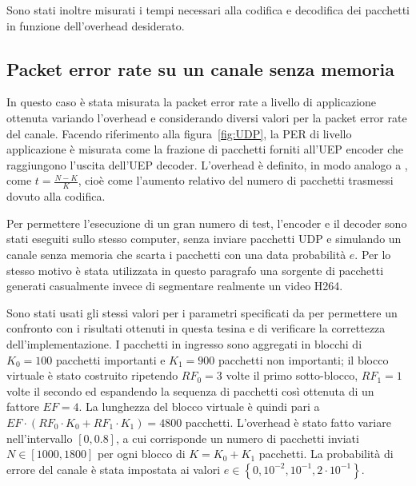 \documentclass[italian, a4paper, 12pt]{article}
\begin{document}
Sono stati inoltre misurati i tempi necessari alla codifica e
decodifica dei pacchetti in funzione dell'overhead desiderato.

\subsection{Packet error rate su un canale senza memoria}
In questo caso è stata misurata la packet error rate a livello di
applicazione ottenuta variando l'overhead e considerando diversi
valori per la packet error rate del canale.
%
Facendo riferimento alla figura~\ref{fig:UDP}, la PER di livello
applicazione è misurata come la frazione di pacchetti forniti all'UEP
encoder che raggiungono l'uscita dell'UEP decoder.
%
L'overhead è definito, in modo analogo a \cite{uep}, come $t =
\frac{N-K}{K}$, cioè come l'aumento relativo del numero di pacchetti
trasmessi dovuto alla codifica.

Per permettere l'esecuzione di un gran numero di test, l'encoder e il
decoder sono stati eseguiti sullo stesso computer, senza inviare
pacchetti UDP e simulando un canale senza memoria che scarta i
pacchetti con una data probabilità $e$.
%
Per lo stesso motivo è stata utilizzata in questo paragrafo una
sorgente di pacchetti generati casualmente invece di segmentare
realmente un video H264.

Sono stati usati gli stessi valori per i parametri specificati da
\cite{uep} per permettere un confronto con i risultati ottenuti in
questa tesina e di verificare la correttezza dell'implementazione.
%
I pacchetti in ingresso sono aggregati in blocchi di $K_0 = 100$
pacchetti importanti e $K_1 = 900$ pacchetti non importanti; il blocco
virtuale è stato costruito ripetendo $RF_0 = 3$ volte il primo
sotto-blocco, $RF_1 = 1$ volte il secondo ed espandendo la sequenza di
pacchetti così ottenuta di un fattore $EF = 4$. La lunghezza del
blocco virtuale è quindi pari a $EF \cdot \left( RF_0 \cdot K_0 + RF_1
\cdot K_1 \right) = 4800$ pacchetti.
%
L'overhead è stato fatto variare nell'intervallo $[0, 0.8]$, a cui
corrisponde un numero di pacchetti inviati $N \in [1000, 1800]$ per
ogni blocco di $K=K_0+K_1$ pacchetti.
%
La probabilità di errore del canale è stata impostata ai valori
$e \in \left\{ 0, 10^{-2}, 10^{-1}, 2 \cdot 10^{-1} \right\}$.
\end{document}

